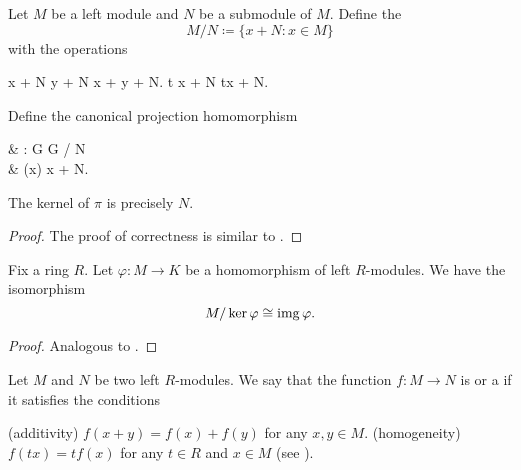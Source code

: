 \begin{definition}\label{def:quotient_left_module}
  Let \( M \) be a left module and \( N \) be a submodule of \( M \). Define the 
  \begin{equation*}
    M / N \coloneqq \{ x + N \colon x \in M \}
  \end{equation*}
  with the operations
  \begin{balign*}
    x + N \oplus y + N \coloneqq x + y + N.
    t \odot x + N \coloneqq tx + N.
  \end{balign*}

  Define the canonical projection homomorphism
  \begin{balign*}
     & \pi: G \to G / N        \\
     & \pi(x) \coloneqq x + N.
  \end{balign*}

  The kernel of \( \pi \) is precisely \( N \).
\end{definition}
\begin{proof}
  The proof of correctness is similar to .
\end{proof}

\begin{theorem}\label{thm:homomorphism_theorem_for_left_modules}
  Fix a ring \( R \). Let \( \varphi: M \to K \) be a homomorphism of left \( R \)-modules. We have the isomorphism
  \begin{equation*}
    M / \ker \varphi \cong \operatorname{img} \varphi.
  \end{equation*}
\end{theorem}
\begin{proof}
  Analogous to .
\end{proof}

\begin{definition}\label{def:linear_operator}
  Let \( M \) and \( N \) be two left \( R \)-modules. We say that the function \( f: M \to N \) is  or a  if it satisfies the conditions
  \begin{thmenum}
    (additivity) \( f(x + y) = f(x) + f(y) \) for any \( x, y \in M \).
    (homogeneity) \( f(tx) = t f(x) \) for any \( t \in R \) and \( x \in M \) (see ).
  \end{thmenum}
\end{definition}

